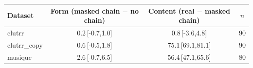 \begin{tabular}{lccc}
\toprule
Dataset & Form (masked chain $-$ no chain) & Content (real $-$ masked chain) & $n$ \\
\midrule
clutrr & 0.2\,{\scriptsize[-0.7,1.0]} & 0.8\,{\scriptsize[-3.6,4.8]} & 90 \\
clutrr\_copy & 0.6\,{\scriptsize[-0.5,1.8]} & 75.1\,{\scriptsize[69.1,81.1]} & 90 \\
musique & 2.6\,{\scriptsize[-0.7,6.5]} & 56.4\,{\scriptsize[47.1,65.6]} & 80 \\
\bottomrule
\end{tabular}
